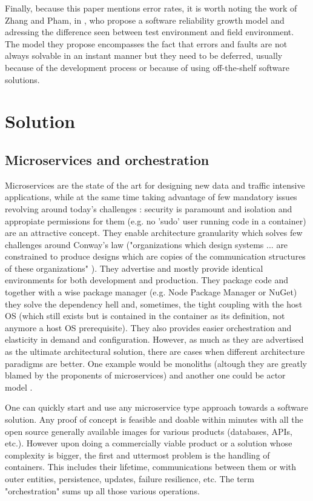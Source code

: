 \documentclass[conference]{IEEEtran}
\begin{document}
    Finally, because this paper mentions error rates, it is worth noting the work of Zhang and Pham, in \cite{b2}, who propose a software reliability growth model and adressing the difference seen between test environment and field environment. The model they propose encompasses the fact that errors and faults are not always solvable in an instant manner but they need to be deferred, usually because of the development process or because of using off-the-shelf software solutions.
    
\section{Solution}

\subsection{Microservices and orchestration}
    Microservices are the state of the art for designing new data and traffic intensive applications, while at the same time taking advantage of few mandatory issues revolving around today's challenges \cite{b5}: security is paramount and isolation and appropiate permissions for them (e.g. no 'sudo' user running code in a container) are an attractive concept. They enable architecture granularity which solves few challenges around Conway's law ("organizations which design systems ... are constrained to produce designs which are copies of the communication structures of these organizations" \cite{b4}). They advertise and mostly provide identical environments for both development and production. They package code and together with a wise package manager (e.g. Node Package Manager or NuGet) they solve the dependency hell and, sometimes, the tight coupling with the host OS (which still exists but is contained in the container as its definition, not anymore a host OS prerequisite). They also provides easier orchestration and elasticity in demand and configuration. However, as much as they are advertised as the ultimate architectural solution, there are cases when different architecture paradigms are better. One example would be monoliths \cite{b6} (altough they are greatly blamed by the proponents of microservices) and another one could be actor model \cite{b7}.

    One can quickly start and use any microservice type approach towards a software solution. Any proof of concept is feasible and doable within minutes with all the open source generally available images for various products (databases, APIs, etc.). However upon doing a commercially viable product or a solution whose complexity is bigger, the first and uttermost problem is the handling of containers. This includes their lifetime, communications between them or with outer entities, persistence, updates, failure resilience, etc. The term "orchestration" sums up all those various operations.
    
\end{document}
